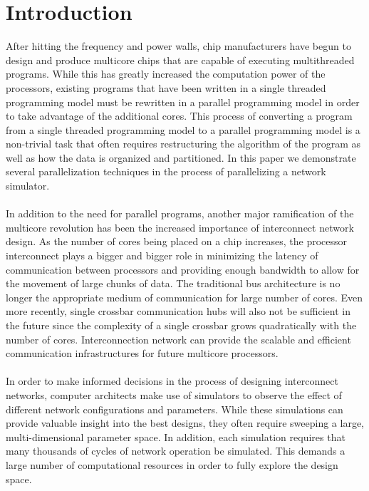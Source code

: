 \documentclass[twocolumn]{article}
\begin{document}
\section{Introduction}
After hitting the frequency and power walls, chip manufacturers have begun
to design and produce multicore chips that are capable of executing
multithreaded programs.  While this has greatly increased the computation power of the processors, existing programs that have been
written in a single threaded programming model must be rewritten in a
parallel programming model in order to take advantage of the additional cores.  This process of converting a program from a single threaded
programming model to a parallel programming model is a non-trivial task
that often requires restructuring the algorithm of the program as well as
how the data is organized and partitioned.  In this paper we demonstrate
several parallelization techniques in the process of parallelizing a
network simulator.\\
~\\
In addition to the need for parallel programs, another major ramification of the multicore revolution has been the
increased importance of interconnect network design.  As the number of
cores being placed on a chip increases, the processor interconnect plays a bigger and
bigger role in minimizing the latency of communication between processors
and providing enough bandwidth to allow for the movement of large chunks
of data. The traditional bus architecture is no longer the appropriate medium of communication for large number of cores. Even more recently, single crossbar communication hubs will also not be sufficient in the future since the complexity of a single crossbar grows quadratically with the number of cores. Interconnection network can provide the scalable and efficient communication
infrastructures for future multicore processors. \\
~\\
In order to make informed decisions in the process of designing
interconnect networks, computer architects make use of simulators to
observe the effect of different network configurations and parameters.  While
these simulations can provide valuable insight into the best designs, they
often require sweeping a large, multi-dimensional parameter space.  In
addition, each simulation requires that many thousands of cycles
of network operation be simulated.  This demands a large number of computational
resources in order to fully explore the design space.\\
~\\
\end{document}
